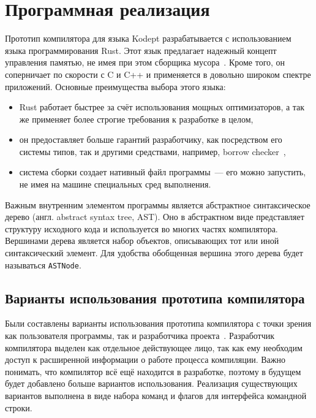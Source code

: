 \chapter{Программная реализация}
\label{ch:chap3_soft_architecture}


Прототип компилятора для языка Kodept разрабатывается с использованием языка программирования Rust.
Этот язык предлагает надежный концепт управления памятью, не имея при этом сборщика мусора~\cite{RustMemory}.
Кроме того, он соперничает по скорости с C и C++ и применяется в довольно широком спектре приложений.
Основные преимущества выбора этого языка:
\begin{itemize}
    \item Rust работает быстрее за счёт использования мощных оптимизаторов, а так же применяет более строгие требования к разработке в целом,
    \item он предоставляет больше гарантий разработчику, как посредством его системы типов, так и другими средствами, например, borrow checker~\cite{RustBchk},
    \item система сборки создает нативный файл программы~--- его можно запустить, не имея на машине специальных сред выполнения.
\end{itemize}

Важным внутренним элементом программы является абстрактное синтаксическое дерево (англ. abstract syntax tree, AST).
Оно в абстрактном виде представляет структуру исходного кода и используется во многих частях компилятора.
Вершинами дерева является набор объектов, описывающих тот или иной синтаксический элемент.
Для удобства обобщенная вершина этого дерева будет называться \lstinline{ASTNode}.

\section{Варианты использования прототипа компилятора}
\label{sec:usage}

Были составлены варианты использования прототипа компилятора с точки зрения как пользователя программы, так и разработчика проекта~.
Разработчик компилятора выделен как отдельное действующее лицо, так как ему необходим доступ к расширенной информации о работе процесса компиляции.
Важно понимать, что компилятор всё ещё находится в разработке, поэтому в будущем будет добавлено больше вариантов использования.
Реализация существующих вариантов выполнена в виде набора команд и флагов для интерфейса командной строки.

